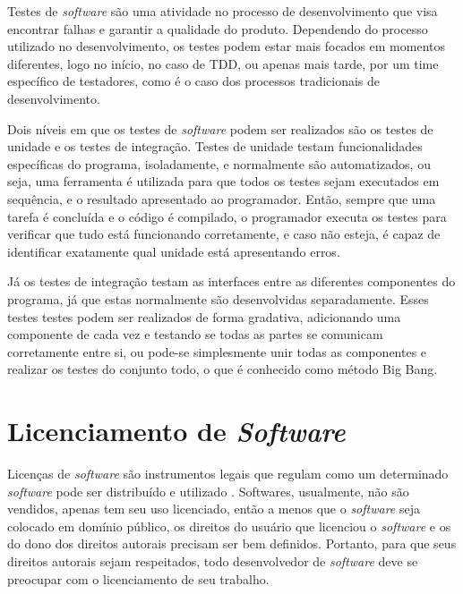 Testes de \emph{software} são uma atividade no processo de desenvolvimento que visa encontrar falhas e garantir a qualidade do produto. Dependendo do processo utilizado no desenvolvimento, os testes podem estar mais focados em momentos diferentes, logo no início, no caso de TDD, ou apenas mais tarde, por um time específico de testadores, como é o caso dos processos tradicionais de desenvolvimento.

Dois níveis em que os testes de \emph{software} podem ser realizados são os testes de unidade e os testes de integração. Testes de unidade testam funcionalidades específicas do programa, isoladamente, e normalmente são automatizados, ou seja, uma ferramenta é utilizada para que todos os testes sejam executados em sequência, e o resultado apresentado ao programador. Então, sempre que uma tarefa é concluída e o código é compilado, o programador executa os testes para verificar que tudo está funcionando corretamente, e caso não esteja, é capaz de identificar exatamente qual unidade está apresentando erros.

Já os testes de integração testam as interfaces entre as diferentes componentes do programa, já que estas normalmente são desenvolvidas separadamente. Esses testes testes podem ser realizados de forma gradativa, adicionando uma componente de cada vez e testando se todas as partes se comunicam corretamente entre si, ou pode-se simplesmente unir todas as componentes e realizar os testes do conjunto todo, o que é conhecido como método Big Bang.


\section{Licenciamento de \emph{Software}}

Licenças de \emph{software} são instrumentos legais que regulam como um determinado \emph{software} pode ser distribuído e utilizado \cite{wikilicense}.
Softwares, usualmente, não são vendidos, apenas tem seu uso licenciado, então a menos que o \emph{software} seja colocado em domínio público, os direitos do usuário que licenciou o \emph{software} e os do dono dos direitos autorais precisam ser bem definidos. Portanto, para que seus direitos autorais sejam respeitados, todo desenvolvedor de \emph{software} deve se preocupar com o licenciamento de seu trabalho.

